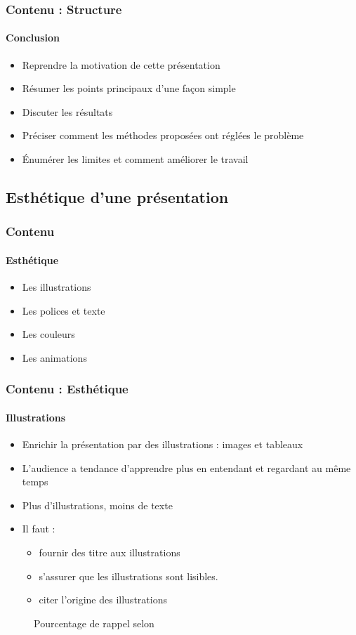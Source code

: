 \documentclass[xcolor=table, usenames,dvipsnames]{beamer}
\begin{document}
\begin{frame}
\frametitle{Contenu : Structure}
\framesubtitle{Conclusion}

\begin{itemize}
	\item Reprendre la motivation de cette présentation
	\item Résumer les points principaux d'une façon simple
	\item Discuter les résultats
	\item Préciser comment les méthodes proposées ont réglées le problème
	\item Énumérer les limites et comment améliorer le travail
\end{itemize}

\end{frame}

\subsection{Esthétique d'une présentation}

\begin{frame}
\frametitle{Contenu}
\framesubtitle{Esthétique}

\begin{itemize}
	\item Les illustrations
	\item Les polices et texte
	\item Les couleurs
	\item Les animations 
\end{itemize}

\end{frame}


\begin{frame}
\frametitle{Contenu : Esthétique}
\framesubtitle{Illustrations}

\begin{minipage}{0.60\textwidth}
\begin{itemize}
	\item Enrichir la présentation par  des illustrations : images et tableaux
	\item L'audience a tendance d'apprendre plus en entendant et regardant au même temps
	\item Plus d'illustrations, moins de texte
	\item Il faut :
	\begin{itemize}
		\item fournir des titre aux illustrations
		\item s'assurer que les illustrations sont lisibles.
		\item citer l'origine des illustrations
	\end{itemize}
\end{itemize}
\end{minipage}
%
\begin{minipage}{0.39\textwidth}
	\begin{figure}
		\caption{Pourcentage de rappel selon \cite{cipolla}}
	\end{figure}
\end{minipage}

\end{frame}
\end{document}
